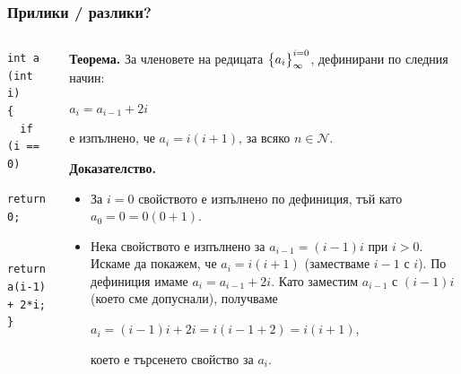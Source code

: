 \documentclass{beamer}
\begin{document}
\begin{frame}[fragile]
\frametitle{Прилики / разлики?}



\begin{columns}[t]
  \begin{column}{0.5\textwidth}
\begin{lstlisting}
int a (int i)
{
  if (i == 0)
    return 0;

  return a(i-1) + 2*i;
}

\end{lstlisting}
  \end{column}
  \begin{column}{0.5\textwidth}
\begin{flushleft}
\textbf{Теорема.} За членовете на редицата $\big{\{}a_i\big{\}}_\infty^{i=0}$, дефинирани по следния начин:

\vspace{10px}
$a_i = a_{i-1} + 2i$
\vspace{10px}

е изпълнено, че $a_i=i(i+1)$, за всяко $n \in \mathcal{N}$.

\vspace{10px}


\textbf{Доказателство.} 

\begin{itemize}
  \item За $i=0$ свойството е изпълнено по дефиниция, тъй като $a_0=0=0(0+1)$.
  \item Нека свойството е изпълнено за $a_{i-1}=(i-1)i$ при $i > 0$. Искаме да покажем, че $a_i=i(i+1)$ (заместваме $i-1$ с $i$). По дефиниция имаме $a_{i} = a_{i-1} + 2i$. Като заместим $a_{i-1}$ с $(i-1)i$ (което сме допуснали), получваме  

  $a_{i} = (i-1)i + 2i = i(i-1+2)=i(i+1)$,

  което е търсенето свойство за $a_{i}$.
\end{itemize}

\end{flushleft}


  \end{column}
\end{columns}


\end{frame}
\end{document}
